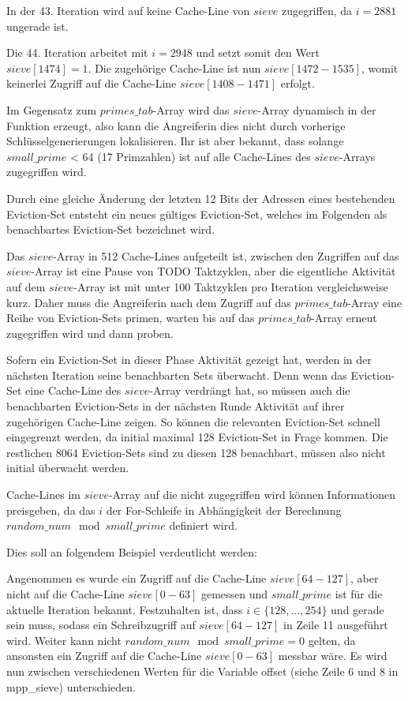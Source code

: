 In der 43. Iteration wird auf keine Cache-Line von $sieve$ zugegriffen, da $i=2881$ ungerade ist.

Die 44. Iteration arbeitet mit $i=2948$ und setzt somit den Wert $sieve[1474] = 1$.
Die zugehörige Cache-Line ist nun $sieve[1472-1535]$, womit keinerlei Zugriff auf die Cache-Line $sieve[1408-1471]$ erfolgt.

Im Gegensatz zum $primes\_tab$-Array wird das $sieve$-Array dynamisch in der Funktion erzeugt, also kann die Angreiferin dies nicht durch vorherige Schlüsselgenerierungen lokalisieren.
Ihr ist aber bekannt, dass solange $small\_prime$ < 64 (17 Primzahlen) ist auf alle Cache-Lines des $sieve$-Arrays zugegriffen wird.

Durch eine gleiche Änderung der letzten 12 Bits der Adressen eines bestehenden Eviction-Set entsteht ein neues gültiges Eviction-Set, welches im Folgenden als benachbartes Eviction-Set bezeichnet wird.

Das $sieve$-Array in 512 Cache-Lines aufgeteilt ist, zwischen den Zugriffen auf das $sieve$-Array ist eine Pause von TODO Taktzyklen, aber die eigentliche Aktivität auf dem $sieve$-Array ist mit unter 100 Taktzyklen pro Iteration vergleichsweise kurz.
Daher muss die Angreiferin nach dem Zugriff auf das $primes\_tab$-Array eine Reihe von Eviction-Sets primen, warten bis auf das $primes\_tab$-Array erneut zugegriffen wird und dann proben.

Sofern ein Eviction-Set in dieser Phase Aktivität gezeigt hat, werden in der nächsten Iteration seine benachbarten Sets überwacht.
Denn wenn das Eviction-Set eine Cache-Line des $sieve$-Array verdrängt hat, so müssen auch die benachbarten Eviction-Sets in der nächsten Runde Aktivität auf ihrer zugehörigen Cache-Line zeigen.
So können die relevanten Eviction-Set schnell eingegrenzt werden, da initial maximal 128 Eviction-Set in Frage kommen.
Die restlichen 8064 Eviction-Sets sind zu diesen 128 benachbart, müssen also nicht initial überwacht werden.

Cache-Lines im $sieve$-Array auf die nicht zugegriffen wird können Informationen preisgeben, da das $i$ der For-Schleife in Abhängigkeit der Berechnung $random\_num \mod small\_prime$ definiert wird.

Dies soll an folgendem Beispiel verdeutlicht werden:

Angenommen es wurde ein Zugriff auf die Cache-Line $sieve[64-127]$, aber nicht auf die Cache-Line $sieve[0-63]$ gemessen und $small\_prime$ ist für die aktuelle Iteration bekannt. Festzuhalten ist, dass $i \in \{128,...,254\}$ und gerade sein muss, sodass ein Schreibzugriff auf $sieve[64-127]$ in Zeile 11 ausgeführt wird.
Weiter kann nicht $random\_num \mod small\_prime = 0$ gelten, da ansonsten ein Zugriff auf die Cache-Line $sieve[0-63]$ messbar wäre. 
Es wird nun zwischen verschiedenen Werten für die Variable offset (siehe Zeile 6 und 8 in mpp_sieve) unterschieden.


